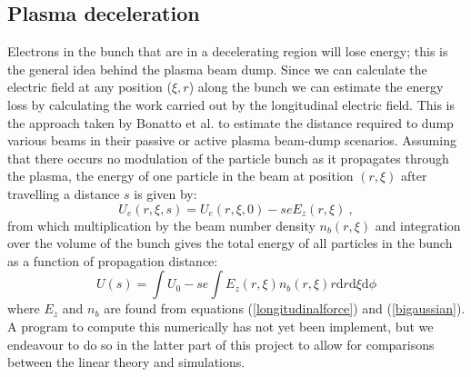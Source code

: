 \subsection{Plasma deceleration}
Electrons in the bunch that are in a decelerating region will lose energy; this is the general idea behind the plasma beam dump. Since we can calculate the electric field at any position ($\xi,r$) along the bunch we can estimate the energy loss by calculating the work carried out by the longitudinal electric field. This is the approach taken by Bonatto et al. \cite{Bonatto2016} to estimate the distance required to dump various beams in their passive or active plasma beam-dump scenarios. Assuming that there occurs no modulation of the particle bunch as it propagates through the plasma, the energy of one particle in the beam at position $(r,\xi)$ after travelling a distance $s$ is given by:
\begin{equation}
U_e(r,\xi,s)=U_e(r,\xi,0)-seE_z(r,\xi)~,
\end{equation}
from which multiplication by the beam number density $n_b(r,\xi)$ and integration over the volume of the bunch gives the total energy of all particles in the bunch as a function of propagation distance:
\begin{equation}
U(s)=\int  U_0-se\int E_z(r,\xi)n_b(r,\xi)r\mathrm{d}r\mathrm{d}\xi\mathrm{d}\phi
\label{energy_loss_bonatto}
\end{equation}
where $E_z$ and $n_b$ are found from equations (\ref{longitudinalforce}) and (\ref{bigaussian}). A program to compute this numerically has not yet been implement, but we endeavour to do so in the latter part of this project to allow for comparisons between the linear theory and simulations.
